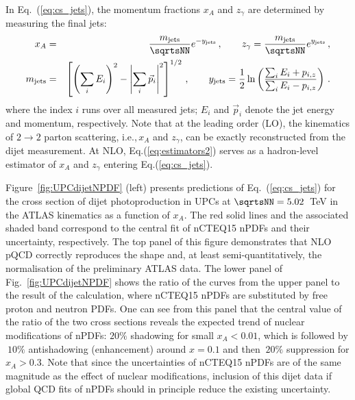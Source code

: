 \documentclass[../report.tex]{subfiles}
\begin{document}
In Eq.~(\ref{eq:cs_jets}), the momentum fractions $x_A$ and $z_{\gamma}$ are determined by measuring the final jets:
\begin{eqnarray}
x_{A} & =& \frac{m_{\rm jets}}{\sqrtsNN}e^{-y_{\rm jets}} \,, \quad \quad z_{\gamma}=\frac{m_{\rm jets}}{\sqrtsNN}e^{y_{\rm jets}} \,, \nonumber\\
m_{\rm jets} &=& \left[\left(\sum_i E_i\right)^2-\left|\sum_i \vec{p}_i \right|^2 \right]^{1/2} \,, \quad \quad
y_{\rm jets}=\frac{1}{2} \ln \left(\frac{\sum_i E_i+p_{i,z}}{\sum_i E_i-p_{i,z}} \right) \,.
\label{eq:estimators2}
 \end{eqnarray}
 where  the index $i$ runs over all measured jets; $E_i$ and $\vec{p}_i$ denote the jet energy and momentum, respectively.
 Note that at the leading order (LO), the kinematics of $2 \to 2$ parton scattering, i.e.,\,$x_A$ and $z_{\gamma}$, 
 can be exactly reconstructed from the dijet measurement.
 At NLO, Eq.(\ref{eq:estimators2}) serves as a hadron-level estimator of $x_A$ and $z_{\gamma}$
 entering Eq.(\ref{eq:cs_jets}).
 
 Figure~\ref{fig:UPCdijetNPDF} (left)
 presents predictions of Eq.~(\ref{eq:cs_jets}) for the cross section of dijet photoproduction in \PbPb UPCs at $\sqrtsNN=5.02$~TeV in the ATLAS kinematics as a function of $x_A$. The red solid lines and the associated shaded band correspond to the central fit of nCTEQ15 nPDFs and their uncertainty, respectively.
The top panel of this figure demonstrates that NLO pQCD correctly reproduces the shape and, at least 
semi-quantitatively, the normalisation of the preliminary ATLAS data.  The lower panel of Fig.~\ref{fig:UPCdijetNPDF} %
shows 
the ratio of the curves from the upper panel to the result of the calculation, where nCTEQ15 nPDFs are substituted by 
free proton and neutron PDFs. One can see from this panel that the central value of the ratio of the two cross sections reveals the expected trend of 
nuclear modifications of nPDFs: $20\%$ shadowing for small $x_A < 0.01$, which is followed by $~10\%$ antishadowing (enhancement)
around $x=0.1$ and then $~20\%$ suppression for $x_A > 0.3$.
Note that since the uncertainties of nCTEQ15 nPDFs are of the same magnitude as the effect of nuclear modifications, 
inclusion of this dijet data if global QCD fits of nPDFs should in principle reduce the existing uncertainty.
\end{document}
